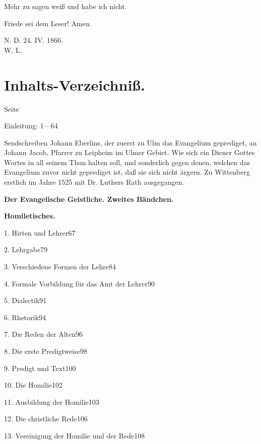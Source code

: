 Mehr zu sagen weiß und habe ich nicht.

Friede sei dem Leser! Amen.

\begin{flushright}
N. D. 24. IV. 1866.\\[0.8em]
W. L.
\end{flushright}

\section*{Inhalts-Verzeichniß.}

\begin{flushright}
Seite
\end{flushright}

Einleitung: 1—64

Sendschreiben Johann Eberlins, der zuerst zu Ulm das Evangelium geprediget, an Johann Jacob, Pfarrer zu Leipheim im Ulmer Gebiet. Wie sich ein Diener Gottes Wortes in all seinem Thun halten soll, und sonderlich gegen denen, welchen das Evangelium zuvor nicht geprediget ist, daß sie sich nicht ärgern. Zu Wittenberg erstlich im Jahre 1525 mit Dr. Luthers Rath ausgegangen.

\par\medskip\noindent\textbf{Der Evangelische Geistliche. Zweites Bändchen.}\par\nopagebreak

\par\medskip\noindent\textbf{Homiletisches.}\par\nopagebreak

1. Hirten und Lehrer\hfill 67

2. Lehrgabe\hfill 79

3. Verschiedene Formen der Lehre\hfill 84

4. Formale Vorbildung für das Amt der Lehrer\hfill 90

5. Dialectik\hfill 91

6. Rhetorik\hfill 94

7. Die Reden der Alten\hfill 96

8. Die erste Predigtweise\hfill 98

9. Predigt und Text\hfill 100

10. Die Homilie\hfill 102

11. Ausbildung der Homilie\hfill 103

12. Die christliche Rede\hfill 106

13. Vereinigung der Homilie und der Rede\hfill 108

